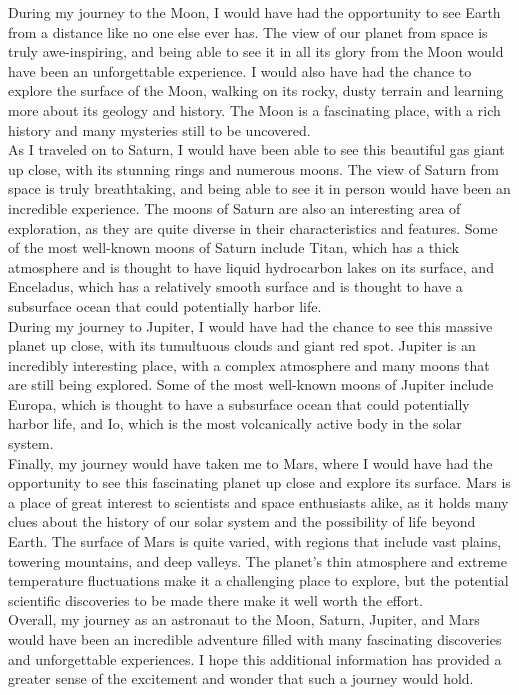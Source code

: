 

During my journey to the Moon, I would have had the opportunity to see Earth from a distance like no one else ever has. The view of our planet from space is truly awe-inspiring, and being able to see it in all its glory from the Moon would have been an unforgettable experience. I would also have had the chance to explore the surface of the Moon, walking on its rocky, dusty terrain and learning more about its geology and history. The Moon is a fascinating place, with a rich history and many mysteries still to be uncovered. \\


As I traveled on to Saturn, I would have been able to see this beautiful gas giant up close, with its stunning rings and numerous moons. The view of Saturn from space is truly breathtaking, and being able to see it in person would have been an incredible experience. The moons of Saturn are also an interesting area of exploration, as they are quite diverse in their characteristics and features. Some of the most well-known moons of Saturn include Titan, which has a thick atmosphere and is thought to have liquid hydrocarbon lakes on its surface, and Enceladus, which has a relatively smooth surface and is thought to have a subsurface ocean that could potentially harbor life. \\


During my journey to Jupiter, I would have had the chance to see this massive planet up close, with its tumultuous clouds and giant red spot. Jupiter is an incredibly interesting place, with a complex atmosphere and many moons that are still being explored. Some of the most well-known moons of Jupiter include Europa, which is thought to have a subsurface ocean that could potentially harbor life, and Io, which is the most volcanically active body in the solar system. \\


Finally, my journey would have taken me to Mars, where I would have had the opportunity to see this fascinating planet up close and explore its surface. Mars is a place of great interest to scientists and space enthusiasts alike, as it holds many clues about the history of our solar system and the possibility of life beyond Earth. The surface of Mars is quite varied, with regions that include vast plains, towering mountains, and deep valleys. The planet's thin atmosphere and extreme temperature fluctuations make it a challenging place to explore, but the potential scientific discoveries to be made there make it well worth the effort. \\


Overall, my journey as an astronaut to the Moon, Saturn, Jupiter, and Mars would have been an incredible adventure filled with many fascinating discoveries and unforgettable experiences. I hope this additional information has provided a greater sense of the excitement and wonder that such a journey would hold.
